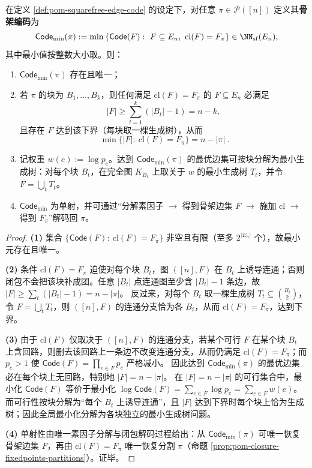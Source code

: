 \begin{theorem}\label{thm:pom-partition-skeleton-compression}
在定义 \ref{def:pom-squarefree-edge-code} 的设定下，对任意 \(\pi\in\mathcal{P}([n])\) 定义其\textbf{骨架编码}为
\[
\mathsf{Code}_{\min}(\pi)
:=\min\left\{\mathsf{Code}(F):\ F\subseteq E_n,\ \mathrm{cl}(F)=F_\pi\right\}\in\NN_{\mathrm{sf}}(E_n),
\]
其中最小值按整数大小取。则：
\begin{enumerate}
  \item \(\mathsf{Code}_{\min}(\pi)\) 存在且唯一；
  \item 若 \(\pi\) 的块为 \(B_1,\dots,B_k\)，则任何满足 \(\mathrm{cl}(F)=F_\pi\) 的 \(F\subseteq E_n\) 必满足
  \[
  |F|\ge \sum_{t=1}^{k}(|B_t|-1)=n-k,
  \]
  且存在 \(F\) 达到该下界（每块取一棵生成树），从而
  \[
  \boxed{\ \min\{|F|:\ \mathrm{cl}(F)=F_\pi\}=n-|\pi|\ }.
  \]
  \item 记权重 \(w(e):=\log p_e\)。达到 \(\mathsf{Code}_{\min}(\pi)\) 的最优边集可按块分解为最小生成树：对每个块 \(B_t\)，在完全图 \(K_{B_t}\) 上取关于 \(w\) 的最小生成树 \(T_t\)，并令 \(F=\bigcup_t T_t\)。
  \item \(\mathsf{Code}_{\min}\) 为单射，并可通过“分解素因子 \(\to\) 得到骨架边集 \(F\) \(\to\) 施加 \(\mathrm{cl}\) \(\to\) 得到 \(F_\pi\)”解码回 \(\pi\)。
\end{enumerate}
\end{theorem}
\begin{proof}
\textbf{(1)} 集合
\(
\{\mathsf{Code}(F):\ \mathrm{cl}(F)=F_\pi\}
\)
非空且有限（至多 \(2^{|E_n|}\) 个），故最小元存在且唯一。
\par
\textbf{(2)} 条件 \(\mathrm{cl}(F)=F_\pi\) 迫使对每个块 \(B_t\)，图 \(([n],F)\) 在 \(B_t\) 上诱导连通；否则闭包不会把该块补成团。任意 \(|B_t|\) 点连通图至少含 \(|B_t|-1\) 条边，故
\(
|F|\ge\sum_t(|B_t|-1)=n-|\pi|
\)。
反过来，对每个 \(B_t\) 取一棵生成树 \(T_t\subseteq \binom{B_t}{2}\)，令 \(F=\bigcup_t T_t\)，则 \(([n],F)\) 的连通分支恰为各 \(B_t\)，从而 \(\mathrm{cl}(F)=F_\pi\)，达到下界。
\par
\textbf{(3)} 由于 \(\mathrm{cl}(F)\) 仅取决于 \(([n],F)\) 的连通分支，若某个可行 \(F\) 在某个块 \(B_t\) 上含回路，则删去该回路上一条边不改变连通分支，从而仍满足 \(\mathrm{cl}(F)=F_\pi\)；而 \(p_e>1\) 使 \(\mathsf{Code}(F)=\prod_{e\in F}p_e\) 严格减小。
因此达到 \(\mathsf{Code}_{\min}(\pi)\) 的最优边集必在每个块上无回路，特别地 \(|F|=n-|\pi|\)。
在 \(|F|=n-|\pi|\) 的可行集合中，最小化 \(\mathsf{Code}(F)\) 等价于最小化
\(
\log\mathsf{Code}(F)=\sum_{e\in F}\log p_e=\sum_{e\in F}w(e)
\)。
而可行性按块分解为“每个 \(B_t\) 上诱导连通”，且 \(|F|\) 达到下界时每个块上恰为生成树；因此全局最小化分解为各块独立的最小生成树问题。
\par
\textbf{(4)} 单射性由唯一素因子分解与闭包解码过程给出：从 \(\mathsf{Code}_{\min}(\pi)\) 可唯一恢复骨架边集 \(F\)，再由 \(\mathrm{cl}(F)=F_\pi\) 唯一恢复分割 \(\pi\)（命题 \ref{prop:pom-closure-fixedpoints-partitions}）。证毕。
\end{proof}

